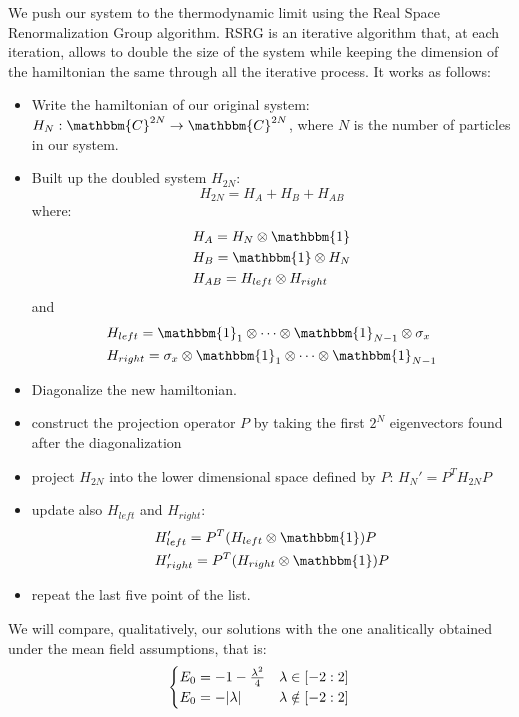 \documentclass[prb,9pt,notitlepage]{revtex4-1}
\begin{document}
We push our system to the thermodynamic limit using the Real Space Renormalization Group algorithm. RSRG is an iterative algorithm that, at each iteration, allows to double the size of the system  while keeping the dimension of the hamiltonian the same through all the iterative process. It works as follows:
\newline
\begin{itemize}
  \item Write the hamiltonian of our original system: $H_N:\mathbbm{C}^{2N}\rightarrow \mathbbm{C} ^{2N}$, where $N$ is the number of particles in our system.
  \item Built up the doubled system $H_{2N}$:
  \begin{equation}
    H_{2N} = H_A + H_B + H_{AB}
  \end{equation}
   where:
   \begin{eqnarray}
     & H_A = H_N\otimes\mathbbm{1} \\
     & H_B = \mathbbm{1}\otimes H_N \\
     & H_{AB} = H_{left} \otimes H_{right}\\
   \end{eqnarray}
   and
   \begin{eqnarray}
     & H_{left} = \mathbbm{1}_1 \otimes\dots\otimes\mathbbm{1}_{N-1}\otimes\sigma_{x}\\
     & H_{right} =  \sigma_{x}\otimes\mathbbm{1}_1\otimes\dots\otimes\mathbbm{1}_{N-1}
   \end{eqnarray}
  \item Diagonalize the new hamiltonian.
  \item construct the projection operator $P$ by taking the first $2^N$ eigenvectors found after the diagonalization
  \item project $H_{2N}$ into the lower dimensional space defined by $P$: $H_{N}' = P^{T}H_{2N}P$
  \item update also $H_{left}$ and $H_{right}$:
  \begin{eqnarray}
    & H_{left}' = P^{T} (H_{left}\otimes\mathbbm{1}) P\\
    & H_{right}' =  P^{T} (H_{right}\otimes\mathbbm{1}) P
  \end{eqnarray}
  \item repeat the last five point of the list.
\end{itemize}
We will compare, qualitatively, our solutions with the one analitically obtained under the mean field assumptions, that is:
\begin{equation}
\begin{cases}
E_0 = -1-\frac{\lambda^2}{4} & \lambda \in [-2:2] \\
E_0 = -\abs{\lambda} & \lambda \notin [-2:2]
\end{cases}
\end{equation}
\end{document}
